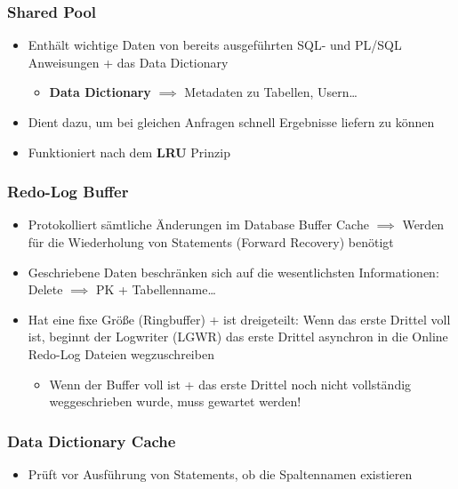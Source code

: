 \subsubsection{Shared Pool}
\begin{itemize}
    \item Enthält wichtige Daten von bereits ausgeführten SQL- und PL/SQL Anweisungen + das Data Dictionary
    \begin{itemize}
        \item \textbf{Data Dictionary} $\implies$ Metadaten zu Tabellen, Usern\dots
    \end{itemize}
    \item Dient dazu, um bei gleichen Anfragen schnell Ergebnisse liefern zu können
    \item Funktioniert nach dem \textbf{LRU} Prinzip
\end{itemize}

\subsubsection{Redo-Log Buffer}
\begin{itemize}
    \item Protokolliert sämtliche Änderungen im Database Buffer Cache $\implies$ Werden für die Wiederholung von Statements (Forward Recovery) benötigt
    \item Geschriebene Daten beschränken sich auf die wesentlichsten Informationen: Delete $\implies$ PK + Tabellenname\dots
    \item Hat eine fixe Größe (Ringbuffer) + ist dreigeteilt: Wenn das erste Drittel voll ist, beginnt der Logwriter (LGWR) das erste Drittel asynchron in die Online Redo-Log Dateien wegzuschreiben
    \begin{itemize}
        \item Wenn der Buffer voll ist + das erste Drittel noch nicht vollständig weggeschrieben wurde, muss gewartet werden!
    \end{itemize}
\end{itemize}

\subsubsection{Data Dictionary Cache}
\begin{itemize}
    \item Prüft vor Ausführung von Statements, ob die Spaltennamen existieren
\end{itemize}


